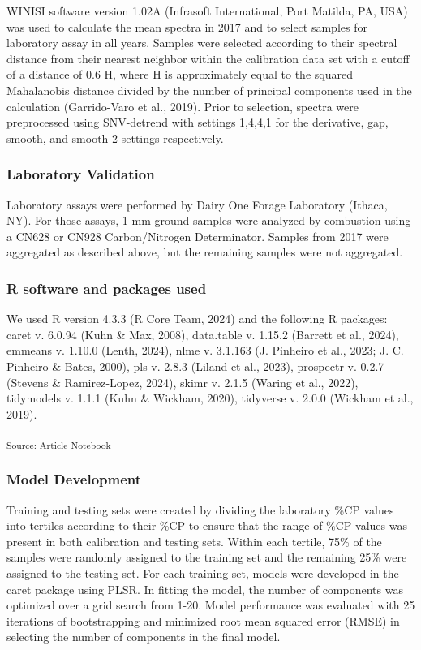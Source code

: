 \documentclass[
]{agujournal2019}
\begin{document}
WINISI software version 1.02A (Infrasoft International, Port Matilda,
PA, USA) was used to calculate the mean spectra in 2017 and to select
samples for laboratory assay in all years. Samples were selected
according to their spectral distance from their nearest neighbor within
the calibration data set with a cutoff of a distance of 0.6 H, where H
is approximately equal to the squared Mahalanobis distance divided by
the number of principal components used in the calculation (Garrido-Varo
et al., 2019). Prior to selection, spectra were preprocessed using
SNV-detrend with settings 1,4,4,1 for the derivative, gap, smooth, and
smooth 2 settings respectively.

\subsubsection{Laboratory Validation}\label{laboratory-validation}

Laboratory assays were performed by Dairy One Forage Laboratory (Ithaca,
NY). For those assays, 1 mm ground samples were analyzed by combustion
using a CN628 or CN928 Carbon/Nitrogen Determinator. Samples from 2017
were aggregated as described above, but the remaining samples were not
aggregated.

\subsubsection{R software and packages
used}\label{r-software-and-packages-used}

We used R version 4.3.3 (R Core Team, 2024) and the following R
packages: caret v. 6.0.94 (Kuhn \& Max, 2008), data.table v. 1.15.2
(Barrett et al., 2024), emmeans v. 1.10.0 (Lenth, 2024), nlme v. 3.1.163
(J. Pinheiro et al., 2023; J. C. Pinheiro \& Bates, 2000), pls v. 2.8.3
(Liland et al., 2023), prospectr v. 0.2.7 (Stevens \& Ramirez-Lopez,
2024), skimr v. 2.1.5 (Waring et al., 2022), tidymodels v. 1.1.1 (Kuhn
\& Wickham, 2020), tidyverse v. 2.0.0 (Wickham et al., 2019).

\textsubscript{Source:
\href{https://rvcrawford.github.io/glowing-system/index.qmd.html}{Article
Notebook}}

\subsubsection{Model Development}\label{model-development}

Training and testing sets were created by dividing the laboratory \%CP
values into tertiles according to their \%CP to ensure that the range of
\%CP values was present in both calibration and testing sets. Within
each tertile, 75\% of the samples were randomly assigned to the training
set and the remaining 25\% were assigned to the testing set. For each
training set, models were developed in the caret package using PLSR. In
fitting the model, the number of components was optimized over a grid
search from 1-20. Model performance was evaluated with 25 iterations of
bootstrapping and minimized root mean squared error (RMSE) in selecting
the number of components in the final model.
\end{document}

